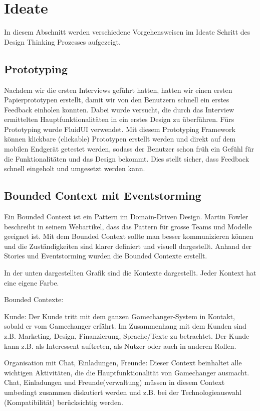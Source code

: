 \section{Ideate}
In diesem Abschnitt werden verschiedene Vorgehensweisen im Ideate Schritt des Design Thinking Prozesses aufgezeigt. 

\subsection{Prototyping}
Nachdem wir die ersten Interviews geführt hatten, hatten wir einen ersten Papierprototypen erstellt, damit wir von den Benutzern schnell ein erstes Feedback einholen konnten. Dabei wurde versucht, die durch das Interview ermittelten Hauptfunktionalitäten in ein erstes Design zu überführen. Fürs Prototyping wurde FluidUI verwendet. Mit diesem Prototyping Framework können klickbare (clickable) Prototypen erstellt werden und direkt auf dem mobilen Endgerät getestet werden, sodass der Benutzer schon früh ein Gefühl für die Funktionalitäten und das Design bekommt. Dies stellt sicher, dass Feedback schnell eingeholt und umgesetzt werden kann.


\subsection{Bounded Context mit Eventstorming}
Ein Bounded Context ist ein Pattern im Domain-Driven Design. Martin Fowler beschreibt in seinem Webartikel, dass das Pattern für grosse Teams und Modelle geeignet ist. \cite{fowler2014bound} Mit dem Bounded Context sollte man besser kommunizieren können und die Zuständigkeiten sind klarer definiert und visuell dargestellt. Anhand der Stories und Eventstorming wurden die Bounded Contexte erstellt.

In der unten dargestellten Grafik sind die Kontexte dargestellt. Jeder Kontext hat eine eigene Farbe.

Bounded Contexte:

Kunde:
Der Kunde tritt mit dem ganzen Gamechanger-System in Kontakt, sobald er vom Gamechanger erfährt. Im Zusammenhang mit dem Kunden sind z.B. Marketing, Design, Finanzierung, Sprache/Texte zu betrachtet. Der Kunde kann z.B. als Interessent auftreten, als Nutzer oder auch in anderen Rollen.

Organisation mit Chat, Einladungen, Freunde:
Dieser Context beinhaltet alle wichtigen Aktivitäten, die die Hauptfunktionalität von Gamechanger ausmacht. Chat, Einladungen und Freunde(verwaltung) müssen in diesem Context umbedingt zusammen diskutiert werden und z.B. bei der Technologieauswahl (Kompatibilität) berücksichtig werden.

